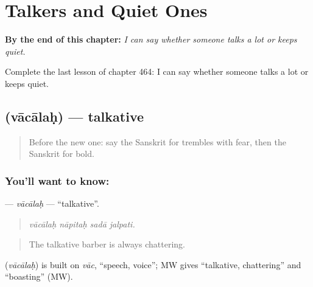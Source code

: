 
\chapter{Talkers and Quiet Ones}
\label{ch:sa-talkers-and-quiet-ones}

\begin{chapteropening}
\textbf{By the end of this chapter:} \emph{I can say whether someone talks a lot or keeps quiet.}

Complete the last lesson of chapter 464: I can say whether someone talks a lot or keeps quiet.
\end{chapteropening}

\section[\texorpdfstring{\sk{वाचालः} (vācālaḥ)}{वाचालः (vācālaḥ)}]{ (vācālaḥ) — talkative}

\label{lesson:SA-C464-vacalah}



\begin{quote}
Before the new one: say the Sanskrit for trembles with fear, then the Sanskrit for bold.
\end{quote}

\subsection*{You'll want to know: }
\textbf{} — \emph{vācālaḥ} — \textquotedblleft{}talkative\textquotedblright{}.

\begin{quote}
   
\end{quote}

\begin{quote}
\emph{vācālaḥ nāpitaḥ sadā jalpati.}
\end{quote}

\begin{quote}
The talkative barber is always chattering.
\end{quote}

\begin{cousinweb}
\textbf{} (\emph{vācālaḥ}) is built on \emph{vāc}, \textquotedblleft{}speech, voice\textquotedblright{}; MW gives \textquotedblleft{}talkative, chattering\textquotedblright{} and \textquotedblleft{}boasting\textquotedblright{} (MW).
\end{cousinweb}

